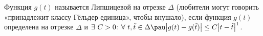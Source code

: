 
 	Функция $g(t)$ называется Липшицевой на отрезке $\Delta$ (любители могут говорить «принадлежит классу Гёльдер-единица», чтобы внушало),
 	если функция  $g(t)$ определена на отрезке $\Delta$ и $\exists\  C>0\colon \forall\  t,\tilde t\in\Delta\pau\big|g(t)-g(\tilde t)\big|\leq C\big|t-\tilde t\big|^1$. 
 